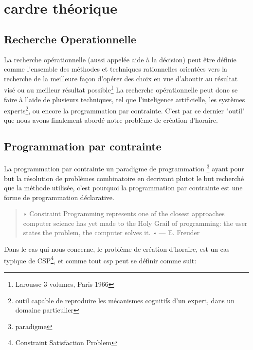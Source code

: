 \section{cardre théorique}
\subsection{Recherche Operationnelle}
La recherche opérationnelle (aussi appelée aide à la décision) peut être définie comme l'ensemble des méthodes et techniques rationnelles orientées vers la recherche de la meilleure façon d'opérer des choix en vue d'aboutir au résultat visé ou au meilleur résultat possible\footnote{Larousse 3 volumes, Paris 1966}
La recherche opérationnelle peut donc se faire à l'aide de plusieurs techniques, tel que l'inteligence artificielle, les systèmes experts\footnote{outil capable de reproduire les mécanismes cognitifs d'un expert, dans un domaine particulier}, ou encore la programmation par contrainte.  C'est par ce dernier "outil" que nous avons finalement abordé notre problème de création d'horaire.
\subsection{Programmation par contrainte}

La programmation par contrainte un paradigme de programmation \footnote{paradigme} ayant pour but la résolution de problèmes combinatoire en
 decrivant plutot le but recherché que la méthode utilisée, c'est pourquoi la programmation par contrainte est une forme de programmation déclarative.
\begin{quote}
« Constraint Programming represents one of the closest approaches computer science has yet made to the Holy Grail of programming: the user states the problem, the computer solves it. »
— E. Freuder
\end{quote}

Dans le cas qui nous concerne, le problème de création d'horaire, est un cas typique de CSP\footnote{Constraint Satisfaction Problem}, et comme tout csp peut se définir comme suit:
   
